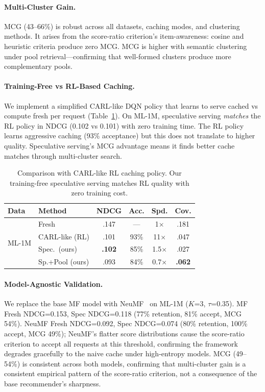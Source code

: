 \documentclass[sigconf,nonacm=false]{acmart}
\begin{document}
\paragraph{Multi-Cluster Gain.}
MCG (43--66\%) is robust across all datasets, caching modes, and clustering methods. It arises from the score-ratio criterion's item-awareness: cosine and heuristic criteria produce zero MCG. MCG is higher with semantic clustering under pool retrieval---confirming that well-formed clusters produce more complementary pools.

\paragraph{Training-Free vs RL-Based Caching.}
We implement a simplified CARL-like DQN policy that learns to serve cached vs compute fresh per request (Table~\ref{tab:carl}). On ML-1M, speculative serving \emph{matches} the RL policy in NDCG (0.102 vs 0.101) with zero training time. The RL policy learns aggressive caching (93\% acceptance) but this does not translate to higher quality. Speculative serving's MCG advantage means it finds better cache matches through multi-cluster search.

\begin{table}[t]
\centering
\caption{Comparison with CARL-like RL caching policy. Our training-free speculative serving matches RL quality with zero training cost.}
\label{tab:carl}
\small
\begin{tabular}{ll cccc}
\toprule
\textbf{Data} & \textbf{Method} & \textbf{NDCG} & \textbf{Acc.} & \textbf{Spd.} & \textbf{Cov.} \\
\midrule
\multirow{4}{*}{ML-1M}
& Fresh & .147 & --- & 1$\times$ & .181 \\
& CARL-like (RL) & .101 & 93\% & 11$\times$ & .047 \\
& \cellcolor{gray!15} Spec.\ (ours) & \cellcolor{gray!15} \textbf{.102} & \cellcolor{gray!15} 85\% & \cellcolor{gray!15} 1.5$\times$ & \cellcolor{gray!15} .027 \\
& \cellcolor{gray!15} Sp.+Pool (ours) & \cellcolor{gray!15} .093 & \cellcolor{gray!15} 84\% & \cellcolor{gray!15} 0.7$\times$ & \cellcolor{gray!15} \textbf{.062} \\
\bottomrule
\end{tabular}
\end{table}

\paragraph{Model-Agnostic Validation.}
We replace the base MF model with NeuMF~\cite{he2017ncf} on ML-1M ($K$=3, $\tau$=0.35). MF Fresh NDCG=0.153, Spec NDCG=0.118 (77\% retention, 81\% accept, MCG 54\%). NeuMF Fresh NDCG=0.092, Spec NDCG=0.074 (80\% retention, 100\% accept, MCG 49\%); NeuMF's flatter score distributions cause the score-ratio criterion to accept all requests at this threshold, confirming the framework degrades gracefully to the naive cache under high-entropy models. MCG (49--54\%) is consistent across both models, confirming that multi-cluster gain is a consistent empirical pattern of the score-ratio criterion, not a consequence of the base recommender's sharpness.
\end{document}
